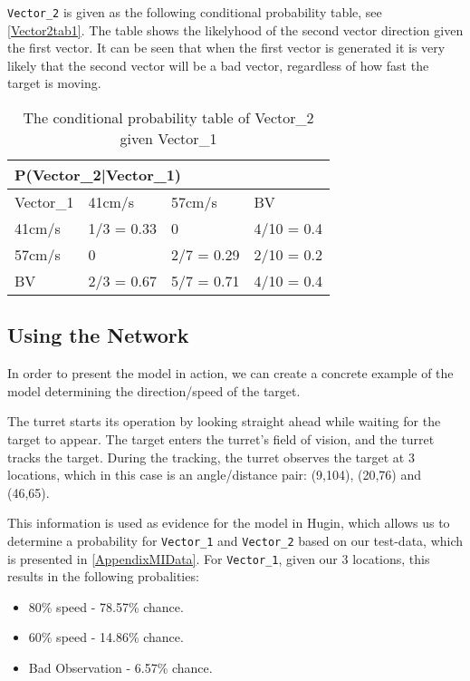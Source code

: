 \texttt{Vector\_2} is given as the following conditional probability table, see
\autoref{Vector2tab1}. The table shows the likelyhood of the second vector
direction given the first vector. It can be seen that when the first vector is
generated it is very likely that the second vector will be a
bad vector, regardless of how fast the target is moving.

\begin{table}[]
\centering
\begin{tabular}{|l|l|l|l|}
\hline
\multicolumn{4}{|l|}{P(Vector\_2|Vector\_1)} \\ \hline
 Vector\_1 & 41cm/s    & 57cm/s    & BV    \\ \hline
 41cm/s    & 1/3 = 0.33 & 0     & 4/10 = 0.4    \\ \hline
 57cm/s    & 0          & 2/7 = 0.29 & 2/10 = 0.2  \\ \hline
 BV        & 2/3 = 0.67 & 5/7 = 0.71 & 4/10 = 0.4  \\ \hline
\end{tabular}
\caption{The conditional probability table of Vector\_2 given Vector\_1}
\label{vector2tab1}
\end{table}


\subsection{Using the Network}
In order to present the model in action, we can create a concrete example of the
model determining the direction/speed of the target.\nl

The turret starts its operation by looking straight ahead while waiting for the
target to appear. The target enters the turret's field of vision, and the turret
tracks the target. During the tracking, the turret observes the target at 3
locations, which in this case is an angle/distance pair: (9,104), (20,76) and
(46,65).\nl

This information is used as evidence for the model in Hugin, which allows
us to determine a probability for \texttt{Vector\_1} and \texttt{Vector\_2}
based on our test-data, which is presented in \autoref{AppendixMIData}. For
\texttt{Vector\_1}, given our 3 locations, this results in the following
probalities:

\begin{itemize}
  \item 80\% speed - 78.57\% chance.
  \item 60\% speed - 14.86\% chance.
  \item Bad Observation - 6.57\% chance.
\end{itemize}

